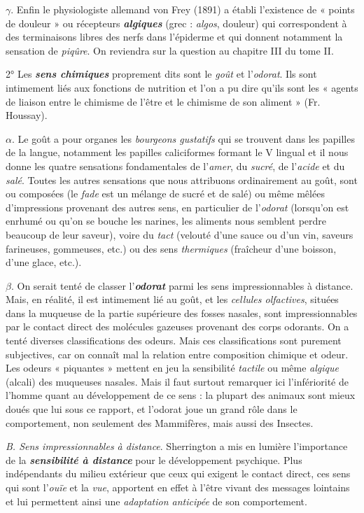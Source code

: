 $\gamma$. Enfin le physiologiste allemand von Frey (1891) a établi l’existence
de « points de douleur » ou récepteurs \textbf{\textit {algiques}} (grec : {\it algos},
douleur) qui correspondent à des terminaisons libres des nerfs dans
l’épiderme et qui donnent notamment la sensation de {\it piqûre}. On
reviendra sur la question au chapitre III du tome II.

2° Les \textbf{\textit {sens chimiques}} proprement dits sont le {\it goût} et l’{\it odorat}. Ils
sont intimement liés aux fonctions de nutrition et l’on a pu dire
qu’ils sont les « agents de liaison entre le chimisme de l’être et le
chimisme de son aliment » (Fr. Houssay).

$\alpha$. Le goût a pour organes les {\it bourgeons gustatifs} qui se trouvent
dans les papilles de la langue, notamment les papilles caliciformes
formant le V lingual et il nous donne les quatre sensations fondamentales
de l’{\it amer}, du {\it sucré}, de l’{\it acide} et du {\it salé}. Toutes les autres sensations
que nous attribuons ordinairement au goût, sont ou composées
(le {\it fade} est un mélange de sucré et de salé) ou même mêlées d’impressions
provenant des autres sens, en particulier de l’{\it odorat} (lorsqu'on
est enrhumé ou qu’on se bouche les narines, les aliments nous semblent
perdre beaucoup de leur saveur), voire du {\it tact} (velouté d’une sauce
ou d’un vin, saveurs farineuses, gommeuses, etc.) ou des sens {\it thermiques}
(fraîcheur d’une boisson, d’une glace, etc.).

$\beta$. On serait tenté de classer l’\textbf{\textit {odorat}} parmi les sens impressionnables
à distance. Mais, en réalité, il est intimement lié au goût, et les
{\it cellules olfactives}, situées dans la muqueuse de la partie supérieure
des fosses nasales, sont impressionnables par le contact direct des
molécules gazeuses provenant des corps odorants. On a tenté diverses
classifications des odeurs. Mais ces classifications sont purement
subjectives, car on connaît mal la relation entre composition chimique
et odeur. Les odeurs « piquantes » mettent en jeu la sensibilité {\it tactile}
ou même {\it algique} (alcali) des muqueuses nasales. Mais il faut surtout
remarquer ici l’infériorité de l’homme quant au développement de ce
sens : la plupart des animaux sont mieux doués que lui sous ce
rapport, et l’odorat joue un grand rôle dans le comportement, non
seulement des Mammifères, mais aussi des Insectes.

{\it B. Sens impressionnables à distance}. Sherrington a mis en lumière
l’importance de la \textbf{\textit {sensibilité à distance}} pour le développement psychique.
Plus indépendants du milieu extérieur que ceux qui exigent
le contact direct, ces sens qui sont l’{\it ouïe} et la {\it vue}, apportent en effet
à l’être vivant des messages lointains et lui permettent ainsi une
{\it adaptation anticipée} de son comportement.

